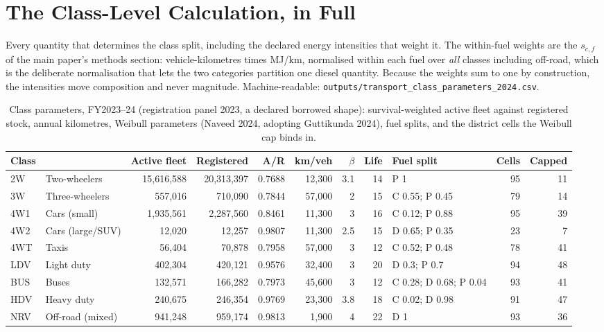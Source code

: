 \section{The Class-Level Calculation, in Full}
\label{app:classes}

Every quantity that determines the class split, including the declared
energy intensities that weight it. The within-fuel weights are the
$s_{c,f}$ of the main paper's methods section: vehicle-kilometres times
MJ/km, normalised within each fuel over \emph{all} classes including
off-road, which is the deliberate normalisation that lets the two
categories partition one diesel quantity. Because the weights sum to one
by construction, the intensities move composition and never magnitude.
Machine-readable: \texttt{outputs/transport\_class\_parameters\_2024.csv}.

\begin{table}[!htbp]
\centering
\scriptsize
\setlength{\tabcolsep}{3pt}
\begin{tabular}{@{}llrrrrrrlrr@{}}
\toprule
\textbf{Class} & & \textbf{Active fleet} & \textbf{Registered} & \textbf{A/R} & \textbf{km/veh} & \textbf{$\beta$} & \textbf{Life} & \textbf{Fuel split} & \textbf{Cells} & \textbf{Capped} \\
\midrule
2W & Two-wheelers & 15,616,588 & 20,313,397 & 0.7688 & 12,300 & 3.1 & 14 & P 1 & 95 & 11 \\
3W & Three-wheelers & 557,016 & 710,090 & 0.7844 & 57,000 & 2 & 15 & C 0.55; P 0.45 & 79 & 14 \\
4W1 & Cars (small) & 1,935,561 & 2,287,560 & 0.8461 & 11,300 & 3 & 16 & C 0.12; P 0.88 & 95 & 39 \\
4W2 & Cars (large/SUV) & 12,020 & 12,257 & 0.9807 & 11,300 & 2.5 & 15 & D 0.65; P 0.35 & 23 & 7 \\
4WT & Taxis & 56,404 & 70,878 & 0.7958 & 57,000 & 3 & 12 & C 0.52; P 0.48 & 78 & 41 \\
LDV & Light duty & 402,304 & 420,121 & 0.9576 & 32,400 & 3 & 20 & D 0.3; P 0.7 & 94 & 48 \\
BUS & Buses & 132,571 & 166,282 & 0.7973 & 45,600 & 3 & 12 & C 0.28; D 0.68; P 0.04 & 93 & 41 \\
HDV & Heavy duty & 240,675 & 246,354 & 0.9769 & 23,300 & 3.8 & 18 & C 0.02; D 0.98 & 91 & 47 \\
NRV & Off-road (mixed) & 941,248 & 959,174 & 0.9813 & 1,900 & 4 & 22 & D 1 & 93 & 36 \\
\bottomrule
\end{tabular}
\caption{Class parameters, FY2023--24 (registration panel 2023, a declared borrowed shape): survival-weighted active fleet against registered stock, annual kilometres, Weibull parameters (Naveed 2024, adopting Guttikunda 2024), fuel splits, and the district cells the Weibull cap binds in.}
\label{tab:classparams}
\end{table}

